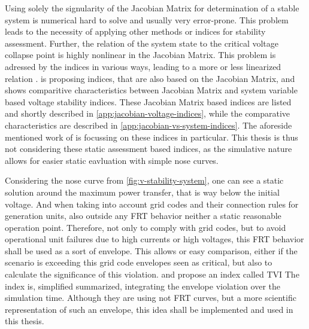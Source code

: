 
Using solely the signularity of the Jacobian Matrix for determination of a stable system is numerical hard to solve and usually very error-prone.
This problem leads to the necessity of applying other methods or indices for stability assessment. 
Further, the relation of the system state to the critical voltage collapse point is highly nonlinear in the Jacobian Matrix. 
This problem is adressed by the indices in various ways, leading to a more or less linearized relation \autocite{machowski_2020,danish_2015}. 
\textcite{danish_2015} is proposing indices, that are also based on the Jacobian Matrix, and shows comparitive characteristics between Jacobian Matrix and system variable based voltage stability indices. 
These Jacobian Matrix based indices are listed and shortly described in \autoref{app:jacobian-voltage-indices}, while the comparative characteristics are described in \autoref{app:jacobian-vs-system-indices}. 
The aforeside mentioned work of \textcite{doigcardet_2010} is focussing on these indices in particular.
This thesis is thus not considering these static assessment based indices, as the simulative nature allows for easier static eavluation with simple nose curves. 

Considering the nose curve from \autoref{fig:v-stability-system}, one can see a static solution around the maximum power transfer, that is way below the initial voltage.
And when taking into account grid codes and their connection rules for generation units, also outside any \ac{FRT} behavior neither a static reasonable operation point.
Therefore, not only to comply with grid codes, but to avoid operational unit failures due to high currents or high voltages, this \acs{FRT} behavior shall be used as a sort of envelope.
This allows or easy comparison, either if the scenario is exceeding this grid code envelopes seen as critical, but also to calculate the significance of this violation.
\textcite{scheiner_2022} and \textcite{wildenhues_2015} propose an index called \ac{TVI}
The index is, simplified summarized, integrating the envelope violation over the simulation time.
Although they are using not \acs{FRT} curves, but a more scientific representation of such an envelope, this idea shall be implemented and used in this thesis.

